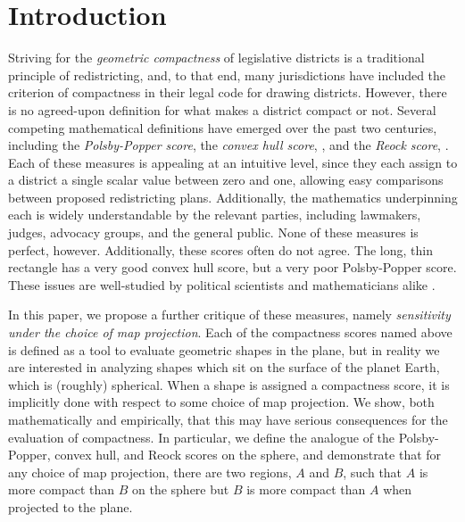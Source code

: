 \section{Introduction}\label{sec:intro}

Striving for the \textit{geometric compactness} of legislative
districts is a traditional principle of redistricting, and, to that
end, many jurisdictions have included the criterion of compactness in
their legal code for drawing districts.  However, there is no
agreed-upon definition for what makes a district compact or not.
Several competing mathematical definitions have emerged over the past
two centuries, including the \textit{Polsby-Popper score},   the \textit{convex hull score}, ,
and the \textit{Reock score}, .  Each of these
measures is appealing at an intuitive level, since they each assign to
a district a single scalar value between zero and one, allowing easy
comparisons between proposed redistricting plans. Additionally, the
mathematics underpinning each is widely understandable by the relevant
parties, including lawmakers, judges, advocacy groups, and the general
public.  None of these measures is perfect, however\cit.   Additionally, these scores often do not agree.
The long, thin rectangle has a very good convex hull score, but a very
poor Polsby-Popper score.  These issues are well-studied by political
scientists and mathematicians alike
\cite{polsby1991third,frolov1975shape,maceachren1985compact}.

In this paper, we propose a further critique of these measures, namely
\textit{sensitivity under the choice of map projection}.  Each of the
compactness scores named above is defined as a tool to evaluate
geometric shapes in the plane, but in reality we are interested in
analyzing shapes which sit on the surface of the planet Earth, which
is (roughly) spherical\cit.  When a shape is assigned a compactness score,
it is implicitly done with respect to some choice of map projection.
We show, both mathematically and empirically, that this may have
serious consequences for the evaluation of compactness.  In
particular, we define the analogue of the Polsby-Popper, convex hull,
and Reock scores on the sphere, and demonstrate that for any choice of
map projection, there are two regions, $A$ and $B$, such that $A$ is
more compact than $B$ on the sphere but $B$ is more compact than $A$
when projected to the plane.
